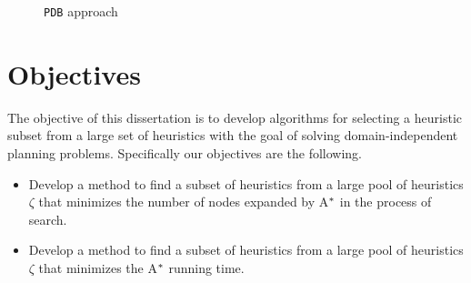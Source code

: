 \begin{figure}[htb]
\caption{\texttt{PDB} approach} \label{fig:ss_ts}
\end{figure}
\fi

\section{Objectives}
The objective of this dissertation is to develop algorithms for selecting a heuristic subset from a large set of heuristics with the goal of solving domain-independent planning problems. Specifically our objectives are the following. 


\begin{itemize}
  \item Develop a method to find a subset of heuristics from a large pool of heuristics $\zeta$ that minimizes the number of nodes expanded by A$\sp{*}$ in the process of search.
  
  \item Develop a method to find a subset of heuristics from a large pool of heuristics $\zeta$ that minimizes the A$\sp{*}$ running time.

\end{itemize}
